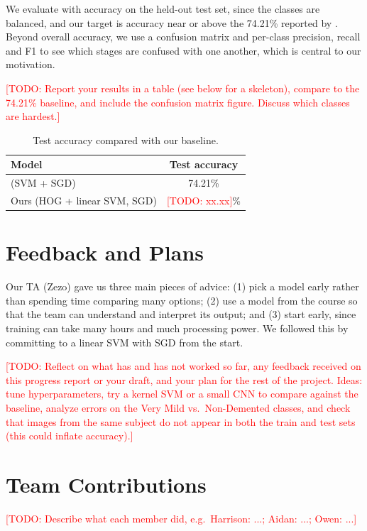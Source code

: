 \documentclass[11pt]{article}
\newcommand{\todo}[1]{\textcolor{red}{[TODO: #1]}}
\begin{document}
We evaluate with accuracy on the held-out test set, since the classes are balanced, and our target is accuracy near or above the 74.21\% reported by \citet{vengala2024}. Beyond overall accuracy, we use a confusion matrix and per-class precision, recall and F1 to see which stages are confused with one another, which is central to our motivation.

\todo{Report your results in a table (see below for a skeleton), compare to the 74.21\% baseline, and include the confusion matrix figure. Discuss which classes are hardest.}

\begin{table}[h]
  \centering
  \begin{tabular}{lc}
    \hline
    \textbf{Model} & \textbf{Test accuracy} \\
    \hline
    \citet{vengala2024} (SVM + SGD) & 74.21\% \\
    Ours (HOG + linear SVM, SGD) & \todo{xx.xx}\% \\
    \hline
  \end{tabular}
  \caption{\label{tab:results} Test accuracy compared with our baseline.}
\end{table}

\section{Feedback and Plans}

Our TA (Zezo) gave us three main pieces of advice: (1) pick a model early rather than spending time comparing many options; (2) use a model from the course so that the team can understand and interpret its output; and (3) start early, since training can take many hours and much processing power. We followed this by committing to a linear SVM with SGD from the start.

\todo{Reflect on what has and has not worked so far, any feedback received on this progress report or your draft, and your plan for the rest of the project. Ideas: tune hyperparameters, try a kernel SVM or a small CNN to compare against the baseline, analyze errors on the Very Mild vs.\ Non-Demented classes, and check that images from the same subject do not appear in both the train and test sets (this could inflate accuracy).}

\section*{Team Contributions}

\todo{Describe what each member did, e.g.\ Harrison: ...; Aidan: ...; Owen: ...}


\end{document}
